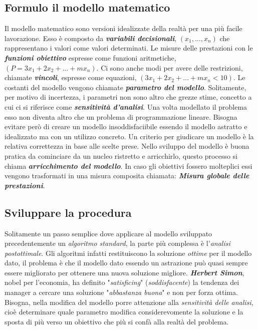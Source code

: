 \documentclass{article}
\begin{document}
    \subsection{Formulo il modello matematico}
      Il modello matematico sono versioni idealizzate della realtà per una più facile lavorazione. Esso è composto da \textbf{\textit{variabili decisionali}}, $(x_1,\dots,x_n)$ che rappresentano i valori come valori determinati. Le misure delle prestazioni con le \textbf{\textit{funzioni obiettivo}} espresse come funzioni aritmetiche, $(P=3x_1+2x_2+\dots+mx_n)$. Ci sono anche modi per avere delle restrizioni, chiamate \textbf{\textit{vincoli}}, espresse come equazioni, $(3x_1+2x_2+\dots+mx_n<10)$. Le costanti del modello vengono chiamate \textbf{\textit{parametro del modello}}. Solitamente, per motivo di incertezza, i parametri non sono altro che grezze stime, concetto a cui ci si riferisce come \textbf{\textit{sensitività d'analisi}}. Una volta modellato il problema esso non diventa altro che un problema di programmazione lineare. Bisogna evitare però di creare un modello insoddisfaciibile essendo il modello astratto e idealizzato ma con un utilizzo concreto. Un criterio per giudicare un modello è la relativa correttezza in base alle scelte prese. Nello sviluppo del modello è buona pratica da cominciare da un nucleo ristretto e arricchirlo, questo processo si chiama \textbf{\textit{arricchimento del modello}}. In caso gli obiettivi fossero molteplici essi vengono trasformati in una misura composita chiamata: \textbf{\textit{Misura globale delle prestazioni}}.

    \subsection{Sviluppare la procedura} 
      Solitamente un passo semplice dove applicare al modello sviluppato precedentemente un \textit{algoritmo standard}, la parte più complessa è l'\textit{analisi postottimale}. Gli algoritmi infatti restituiscono la soluzione \textit{ottime} per il modello dato, il problema è che il modello dato essendo un astrazione può quasi sempre essere migliorato per ottenere una nuova soluzione migliore. \textbf{\textit{Herbert Simon}}, nobel per l'economia, ha definito "\textit{satisficing}" (\textit{soddisfacente}) la tendenza dei manager a cercare una soluzione "\textit{abbastanza buona}" e non per forza ottima. Bisogna, nella modifica del modello porre attenzione alla \textit{sensitività delle analisi}, cioè determinare quale parametro modifica considerevomente la soluzione e la sposta di più verso un obiettivo che più si confà alla realtà del problema.
\end{document}
